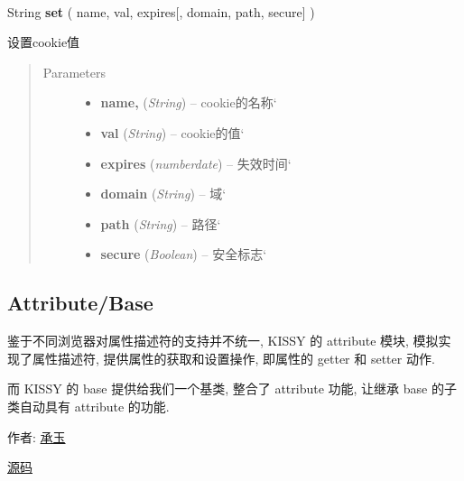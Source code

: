 \documentclass[letterpaper,10pt,english]{sphinxmanual}
\begin{document}
\begin{fulllineitems}
\label{api/core/cookie/index:cookie.set}~
\begin{DUlineblock}{0em}
\item[] String \textbf{set} ( name, val, expires{[}, domain, path, secure{]} )
\item[] 设置cookie值
\end{DUlineblock}
\begin{quote}\begin{description}
\item[{Parameters}] \leavevmode\begin{itemize}
\item {}
\textbf{name,} (\emph{String}) -- cookie的名称{}`

\item {}
\textbf{val} (\emph{String}) -- cookie的值{}`

\item {}
\textbf{expires} (\emph{number\textbar{}date}) -- 失效时间{}`

\item {}
\textbf{domain} (\emph{String}) -- 域{}`

\item {}
\textbf{path} (\emph{String}) -- 路径{}`

\item {}
\textbf{secure} (\emph{Boolean}) -- 安全标志{}`

\end{itemize}

\end{description}\end{quote}

\end{fulllineitems}

\label{api/core/base/index:module-attribute}

\subsection{Attribute/Base}
\label{api/core/base/index:attribute-base}\label{api/core/base/index::doc}
\begin{DUlineblock}{0em}
\item[] 鉴于不同浏览器对属性描述符的支持并不统一, KISSY 的 attribute 模块, 模拟实现了属性描述符, 提供属性的获取和设置操作, 即属性的 getter 和 setter 动作.
\item[] 而 KISSY 的 base 提供给我们一个基类, 整合了 attribute 功能, 让继承 base 的子类自动具有 attribute 的功能.
\item[] 作者: \href{mailto:yiminghe@gmail.com}{承玉}
\item[] \href{https://github.com/kissyteam/kissy/tree/master/src/base}{源码}
\end{DUlineblock}
\end{document}

